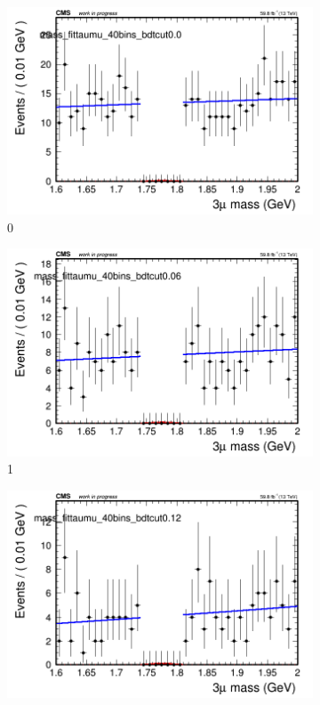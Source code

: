 \begin{figure}[h!]
    \centering
    \begin{subfigure}{0.2\textwidth}
        \includegraphics[width=\textwidth]{power_law/plots/taumu/massfit_taumu_40bins_bdtcut0.0.png}
        \caption{0}
    \end{subfigure}
    \begin{subfigure}{0.2\textwidth}
        \includegraphics[width=\textwidth]{power_law/plots/taumu/massfit_taumu_40bins_bdtcut0.06.png}
        \caption{1}
    \end{subfigure}
    \begin{subfigure}{0.2\textwidth}
        \includegraphics[width=\textwidth]{power_law/plots/taumu/massfit_taumu_40bins_bdtcut0.12.png}

\end{subfigure}
\end{figure}
